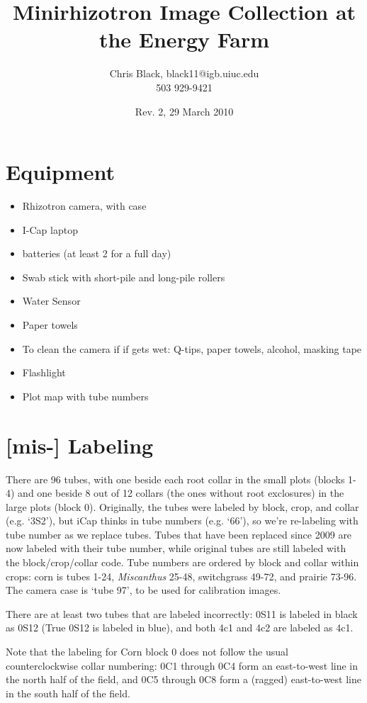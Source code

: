 \documentclass[11pt]{article}
\title{Minirhizotron Image Collection at the Energy Farm}
\author{Chris Black, black11@igb.uiuc.edu\\503 929-9421}
\date{Rev. 2, 29 March 2010}
\begin{document}
\maketitle


\section{Equipment}
	\begin{itemize}
		\item{Rhizotron camera, with case}
		\item{I-Cap laptop}
		\item{batteries (at least 2 for a full day)}	
		\item{Swab stick with short-pile and long-pile rollers}
		\item{Water Sensor}
		\item{Paper towels}
		\item{To clean the camera if if gets wet: Q-tips, paper towels, alcohol, masking tape}
		\item{Flashlight}
		\item{Plot map with tube numbers}
	\end{itemize}
	
\section{[mis-] Labeling} 
	There are 96 tubes, with one beside each root collar in the small plots (blocks 1-4) and one beside 8 out of 12 collars (the ones without root exclosures) in the large plots (block 0). Originally, the tubes were labeled by block, crop, and collar (e.g. `3S2'), but iCap thinks in tube numbers (e.g. `66'), so we're re-labeling with tube number as we replace tubes. Tubes that have been replaced since 2009 are now labeled with their tube number, while original tubes are still labeled with the block/crop/collar code. Tube numbers are ordered by block and collar within crops: corn is tubes 1-24, \textit{Miscanthus} 25-48, switchgrass 49-72, and prairie 73-96. The camera case is `tube 97', to be used for calibration images. 
	
	There are at least two tubes that are labeled incorrectly: 0S11 is labeled in black as 0S12 (True 0S12 is labeled in blue), and both 4c1 and 4c2 are labeled as 4c1.
	
	Note that the labeling for Corn block 0 does not follow the usual counterclockwise collar numbering: 0C1 through 0C4 form an east-to-west line in the north half of the field, and 0C5 through 0C8 form a (ragged) east-to-west line in the south half of the field.
	
\end{document}
